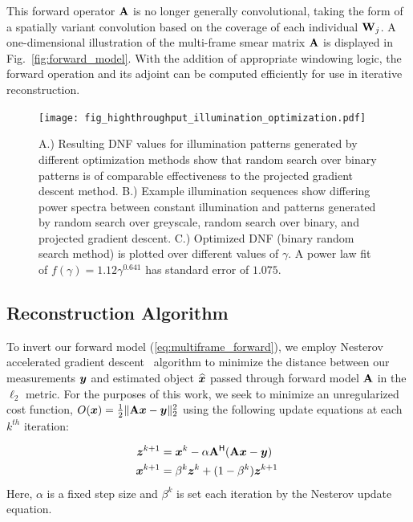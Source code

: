 This forward operator $\mathbf{A}$ is no longer generally convolutional, taking the form of a spatially variant convolution based on the coverage of each individual $\mathbf{W}_j$. A one-dimensional illustration of the multi-frame smear matrix $\mathbf{A}$ is displayed in Fig.~\ref{fig:forward_model}. 
With the addition of appropriate windowing logic, the forward operation and its adjoint can be computed efficiently for use in iterative reconstruction.

\begin{figure}
  \centering
    \texttt{[image: fig\_highthroughput\_illumination\_optimization.pdf]}

  \caption{ \label{fig:illum_optimization} A.) Resulting DNF values for illumination patterns generated by different optimization methods show that random search over binary patterns is of comparable effectiveness to the projected gradient descent method. B.) Example illumination sequences show differing power spectra between constant illumination and patterns generated by random search over greyscale, random search over binary, and projected gradient descent. C.) Optimized DNF (binary random search method) is plotted over different values of $\gamma$. A power law fit of $f(\gamma) = 1.12 \gamma^{0.641}$ has standard error of $1.075$.}
\end{figure}

\subsection{Reconstruction Algorithm}\label{sec:highthroughput:recon}
To invert our forward model (\eqref{eq:multiframe_forward}), we employ Nesterov accelerated gradient descent~\cite{nesterov} algorithm to minimize the distance between our measurements $\bm{y}$ and estimated object $\widehat {\bm{x}}$ passed through forward model $\mathbf{A}$ in the $\ell_2$ metric. For the purposes of this work, we seek to minimize an unregularized cost function, $O(\bm{x}) = \frac{1}{2}\|\mathbf{A}\bm{x} - \bm{y}\|_2^2$ using the following update equations at each $k^{th}$ iteration:

\begin{align}\label{eq:reconstruction}
\begin{split}
    \bm z^{k+1} &= \bm{x}^k - \alpha \mathbf{A}^{\mathsf{H}} (\mathbf{A}\bm{x} - \bm{y}) \\
    \bm{x}^{k+1} &= \beta^k \bm z^k + (1-\beta^k) \bm z^{k+1}\:    
\end{split}
\end{align}
Here, $\alpha$ is a fixed step size and $\beta^k$ is set each iteration by the Nesterov update equation.

